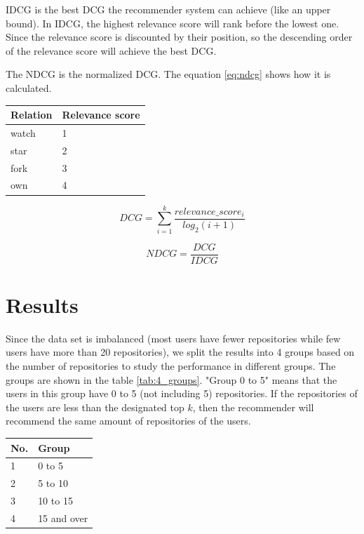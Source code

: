 \documentclass[11pt,twoside]{report}
\begin{document}
IDCG is the best DCG the recommender system can achieve (like an upper bound). In IDCG, the highest relevance score will rank before the lowest one. Since the relevance score is discounted by their position, so the descending order of the relevance score will achieve the best DCG.

The NDCG is the normalized DCG. The equation \ref{eq:ndcg} shows how it is calculated.

\begin{center}
    \begin{tabular}{l | l}
    \hline
    Relation & Relevance score \\
    \hline
    watch & 1 \\
    star & 2 \\
    fork & 3 \\
    own & 4
    \end{tabular}
    \label{tab:relevance_score}
\end{center}

\begin{equation}
    DCG=\sum_{i=1}^k\frac{relevance\_score_i}{log_2(i+1)}
    \label{eq:dcg}
\end{equation}

\begin{equation}
    NDCG=\frac{DCG}{IDCG}
    \label{eq:ndcg}
\end{equation}

\section{Results}
Since the data set is imbalanced (most users have fewer repositories while few users have more than 20 repositories), we split the results into 4 groups based on the number of repositories to study the performance in different groups. The groups are shown in the table \ref{tab:4_groups}. "Group 0 to 5" means that the users in this group have 0 to 5 (not including 5) repositories. If the repositories of the users are less than the designated top $k$, then the recommender will recommend the same amount of repositories of the users.

\begin{center}
    \begin{tabular}{l | l}
    \hline
    No. & Group \\
    \hline
    1 & 0 to 5 \\
    2 & 5 to 10 \\
    3 & 10 to 15 \\
    4 & 15 and over
    \end{tabular}
    \label{tab:4_groups}
\end{center}
\end{document}
